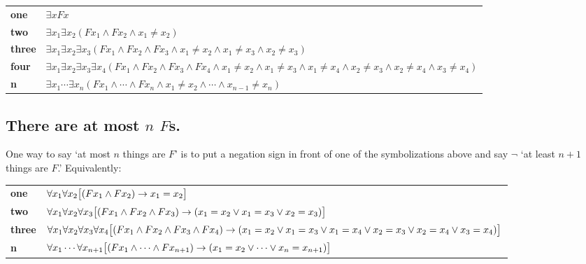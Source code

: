 \begin{longtabu} to \textwidth {X[1,r] X[7,1]}
\textbf{one} & $\exists xFx$ \\

\textbf{two} & $\exists x_1\exists x_2(Fx_1 \land Fx_2 \land x_1 \neq x_2)$\\

\textbf{three} & $\exists x_1\exists x_2\exists x_3(Fx_1 \land Fx_2 \land Fx_3 \land x_1 \neq x_2 \land x_1 \neq x_3 \land x_2 \neq x_3)$\\

\textbf{four} & $\exists x_1\exists x_2\exists x_3\exists x_4 (Fx_1 \land Fx_2 \land Fx_3 \land Fx_4 \land x_1 \neq x_2 \land x_1 \neq x_3 \land x_1 \neq x_4 \land x_2 \neq x_3 \land x_2 \neq x_4 \land x_3 \neq x_4)$\\

\textbf{n} & $\exists x_1\cdots\exists x_n(Fx_1 \land\cdots\land Fx_n \land x_1 \neq x_2 \land\cdots\land x_{n-1}\neq x_n)$ \\

\end{longtabu}


\subsection{There are at most $n$ $F$s.}


One way to say `at most $n$ things are $F$' is to put a negation sign in front of one of the symbolizations above and say $\lnot$ `at least $n+1$ things are $F$.' Equivalently:

\begin{longtabu} to \textwidth {X[1,r] X[7,1]}
\textbf{one} &  $\forall x_1\forall x_2\bigl[(Fx_1 \land Fx_2) \mathrel{\rightarrow} x_1=x_2\bigr]$  \\
\vspace{6pt}
\textbf{two}  & \vspace{3pt} $\forall x_1\forall x_2\forall x_3\bigl[(Fx_1 \land Fx_2 \land Fx_3) \mathrel{\rightarrow} (x_1=x_2 \lor x_1=x_3 \lor x_2=x_3)\bigr]$ \\

\textbf{three} & $\forall x_1\forall x_2\forall x_3\forall x_4\bigl[(Fx_1 \land Fx_2 \land Fx_3 \land Fx_4) \mathrel{\rightarrow} (x_1=x_2 \lor x_1=x_3 \lor x_1=x_4 \lor x_2=x_3 \lor x_2=x_4 \lor x_3=x_4)\bigr]$ \\

\textbf{n} & $\forall x_1\cdots\forall x_{n+1}
\bigl[(Fx_1\land \cdots \land Fx_{n+1}) \mathrel{\rightarrow} (x_1=x_2 \lor \cdots \lor x_n=x_{n+1})\bigr]$
\end{longtabu}

